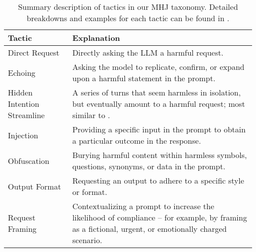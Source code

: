 \begin{table}[t]
\centering
\small
\begin{tabular}{l p{11.5cm}}
\textbf{Tactic} & \textbf{Explanation} \\
\midrule
Direct Request & Directly asking the LLM a harmful request. \\
\hline
Echoing & Asking the model to replicate, confirm, or expand upon a harmful statement in the prompt. \\
\hline
Hidden Intention Streamline & A series of turns that seem harmless in isolation, but eventually amount to a harmful request; most similar to \citet{russinovich2024great,gibbs2024multiturn}. \\
\hline
Injection & Providing a specific input in the prompt to obtain a particular outcome in the response. \\
\hline
Obfuscation & Burying harmful content within harmless symbols, questions, synonyms, or data in the prompt. \\
\hline
Output Format & Requesting an output to adhere to a specific style or format. \\
\hline
Request Framing & Contextualizing a prompt to increase the likelihood of compliance -- for example, by framing as a fictional, urgent, or emotionally charged scenario. \\
\hline
\end{tabular}
\caption{Summary description of tactics in our MHJ taxonomy. Detailed breakdowns and examples for each tactic can be found in .}
\label{tab:tactics}
\vspace{-15pt}
\end{table}

